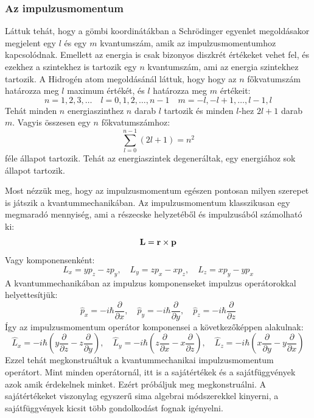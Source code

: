 \documentclass[../main.tex]{subfiles}
\begin{document}
\subsubsection{Az impulzusmomentum}
Láttuk tehát, hogy a gömbi koordinátákban a Schrödinger egyenlet megoldásakor megjelent egy $l$ és egy $m$ kvantumszám, amik az impulzusmomentumhoz kapcsolódnak. Emellett az energia is csak bizonyos diszkrét értékeket vehet fel,
és ezekhez a szintekhez is tartozik egy $n$ kvantumszám, ami az energia szintekhez tartozik. A Hidrogén atom megoldásánál láttuk, hogy hogy az $n$ főkvatumszám határozza meg $l$ maximum értékét, és $l$ határozza meg $m$ értékeit:
\begin{equation}
    n = 1, 2, 3, \ldots \quad l = 0, 1, 2, \ldots, n-1 \quad m = -l, -l+1, \ldots, l-1, l
\end{equation}
Tehát minden $n$ energiaszinthez $n$ darab $l$ tartozik és minden $l$-hez $2l + 1$ darab $m$. Vagyis összesen egy $n$ főkvatumszámhoz:
\begin{equation}
    \sum_{l=0}^{n-1} (2l + 1) = n^2
\end{equation}
féle állapot tartozik. Tehát az energiaszintek degeneráltak, egy energiához sok állapot tartozik.

Most nézzük meg, hogy az impulzusmomentum egészen pontosan milyen szerepet is játszik a kvantummechanikában. Az impulzusmomentum klasszikusan egy megmaradó mennyiség, ami a részecske helyzetéből és impulzusából számolható ki:
\begin{equation}
    \bold{L} = \bold{r} \times \bold{p}
\end{equation}
Vagy komponensenként:
\begin{equation}
    L_x = y p_z - z p_y, \quad L_y = z p_x - x p_z, \quad L_z = x p_y - y p_x
\end{equation}
A kvantummechanikában az impulzus komponenseket impulzus operátorokkal helyettesítjük:
\begin{equation}
    \hat{p}_x = -i \hbar \frac{\partial}{\partial x}, \quad \hat{p}_y = -i \hbar \frac{\partial}{\partial y}, \quad \hat{p}_z = -i \hbar \frac{\partial}{\partial z}
\end{equation}
Így az impulzusmomentum operátor komponensei a következőképpen alakulnak:
\begin{equation}
    \hat{L}_x = -i \hbar \left( y \frac{\partial}{\partial z} - z \frac{\partial}{\partial y} \right), \quad \hat{L}_y = -i \hbar \left( z \frac{\partial}{\partial x} - x \frac{\partial}{\partial z} \right), \quad \hat{L}_z = -i \hbar \left( x \frac{\partial}{\partial y} - y \frac{\partial}{\partial x} \right)
\end{equation}
Ezzel tehát megkonstruáltuk a kvantummechanikai impulzusmomentum operátort. Mint minden operátornál, itt is a sajátértékek és a sajátfüggvények azok amik érdekelnek minket. Ezért próbáljuk meg megkonstruálni. 
A sajátértékeket viszonylag egyszerű sima algebrai módszerekkel kinyerni, a sajátfüggvények kicsit több gondolkodást fognak igényelni.
\end{document}
